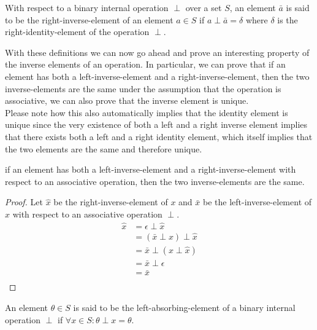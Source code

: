\begin{definition}
    With respect to a binary internal operation $\perp$ over a set $S$, an element $\bar{a}$ is said to be the right-inverse-element of
    an element $a \in S$ if $a \perp \bar{a} = \delta$ where $\delta$ is the right-identity-element of the operation $\perp$.
\end{definition}

With these definitions we can now go ahead and prove an interesting property of the inverse elements of an operation. In particular, we can prove that
if an element has both a left-inverse-element and a right-inverse-element, then the two inverse-elements are the same under the assumption that the operation is 
associative, we can also prove that the inverse element is unique. \\

Please note how this also automatically implies that the identity element is unique since 
the very existence of both a left and a right inverse element implies that there exists both a left and a right identity element, which itself implies that 
the two elements are the same and therefore unique. 

\newpage

\begin{lemma}
    if an element has both a left-inverse-element and a right-inverse-element with respect to an associative operation, 
    then the two inverse-elements are the same.
\end{lemma}
\begin{proof}
    Let $\hat{x}$ be the right-inverse-element of $x$ and $\bar{x}$ be the left-inverse-element of $x$ with respect to an associative operation $\perp$.
    \begin{align*}
        \hat{x} &= \epsilon \perp \hat{x}           \\
                &= (\bar{x} \perp x) \perp \hat{x}  \\
                &= \bar{x} \perp (x \perp \hat{x})  \\
                &= \bar{x} \perp \epsilon           \\
                &= \bar{x}                          \\
    \end{align*}
\end{proof}

\begin{definition}
    An element $\theta \in S$ is said to be the left-absorbing-element of a binary internal operation $\perp$ if $\forall x \in S: \theta \perp x = \theta$.
\end{definition}



